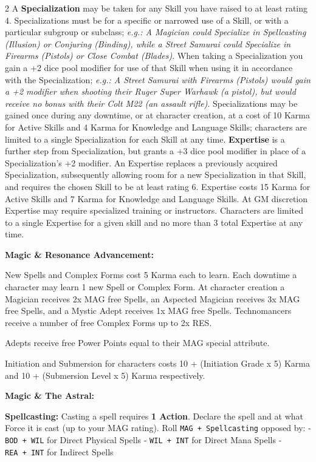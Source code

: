 \documentclass[
  oneside]{article}
\begin{document}
\begin{multicols}{2}
A \textbf{Specialization} may be taken for any
Skill you have raised to at least rating 4.
Specializations must be for a specific or narrowed
use of a Skill, or with a particular subgroup or
subclass; \emph{e.g.: A Magician could Specialize
in Spellcasting (Illusion) or Conjuring (Binding),
while a Street Samurai could Specialize in
Firearms (Pistols) or Close Combat (Blades)}. When
taking a Specialization you gain a +2 dice pool
modifier for use of that Skill when using it in
accordance with the Specialization; \emph{e.g.: A
Street Samurai with Firearms (Pistols) would gain
a +2 modifier when shooting their Ruger Super
Warhawk (a pistol), but would receive no bonus
with their Colt M22 (an assault rifle)}.
Specializations may be gained once during any
downtime, or at character creation, at a cost of
10 Karma for Active Skills and 4 Karma for
Knowledge and Language Skills; characters are
limited to a single Specialization for each Skill
at any time. \textbf{Expertise} is a further step
from Specialization, but grants a +3 dice pool
modifier in place of a Specialization's +2
modifier. An Expertise replaces a previously
acquired Specialization, subsequently allowing
room for a new Specialization in that Skill, and
requires the chosen Skill to be at least rating 6.
Expertise costs 15 Karma for Active Skills and 7
Karma for Knowledge and Language Skills. At GM
discretion Expertise may require specialized
training or instructors. Characters are limited to
a single Expertise for a given skill and no more
than 3 total Expertise at any time.

\textbf{Magic \& Resonance Advancement:}

New Spells and Complex Forms cost 5 Karma each to
learn. Each downtime a character may learn 1 new
Spell or Complex Form. At character creation a
Magician receives 2x MAG free Spells, an Aspected
Magician receives 3x MAG free Spells, and a Mystic
Adept receives 1x MAG free Spells. Technomancers
receive a number of free Complex Forms up to 2x
RES.

Adepts receive free Power Points equal to their
MAG special attribute.

Initiation and Submersion for characters costs 10
+ (Initiation Grade x 5) Karma and 10 +
(Submersion Level x 5) Karma respectively.

\textbf{Magic \& The Astral:}

\textbf{Spellcasting:} Casting a spell requires
\textbf{1 Action}. Declare the spell and at what
Force it is cast (up to your MAG rating). Roll
\texttt{MAG\ +\ Spellcasting} opposed by: -
\texttt{BOD\ +\ WIL} for Direct Physical Spells -
\texttt{WIL\ +\ INT} for Direct Mana Spells -
\texttt{REA\ +\ INT} for Indirect Spells


\end{multicols}
\end{document}
